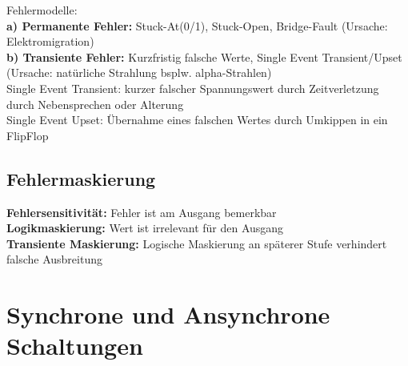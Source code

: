 \documentclass[english]{latex4ei/latex4ei_sheet}
\begin{document}
Fehlermodelle:\\
\textbf{a) Permanente Fehler:} Stuck-At(0/1), Stuck-Open, Bridge-Fault (Ursache: Elektromigration)\\
\textbf{b) Transiente Fehler:} Kurzfristig falsche Werte, Single Event Transient/Upset (Ursache: natürliche Strahlung bsplw. alpha-Strahlen)\\
Single Event Transient: kurzer falscher Spannungswert durch Zeitverletzung durch Nebensprechen oder Alterung\\
Single Event Upset: Übernahme eines falschen Wertes durch Umkippen in ein FlipFlop

\subsection{Fehlermaskierung}

\textbf{Fehlersensitivität:} Fehler ist am Ausgang bemerkbar\\
\textbf{Logikmaskierung:} Wert ist irrelevant für den Ausgang\\
\textbf{Transiente Maskierung:} Logische Maskierung an späterer Stufe verhindert falsche Ausbreitung\\

\section{Synchrone und Ansynchrone Schaltungen}




\end{document}
